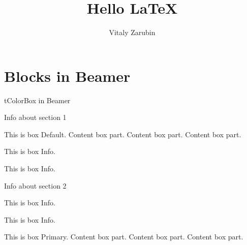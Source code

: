 \documentclass{beamer}
\begin{document}
    \title{Hello LaTeX}
    \author{Vitaly Zarubin}

    \begin{frame}
        \titlepage
    \end{frame}

    \section{Blocks in Beamer}\label{sec:blocks-in-beamer}
    \begin{frame}{tColorBox in Beamer}
        \begin{multicols}{2}

            Info about section 1

            \begin{mybox}
                This is box Default.
                \tcblower
                Content box part.
                Content box part.
                Content box part.
            \end{mybox}

            \begin{myboxinfo}
                This is box Info.
            \end{myboxinfo}

            \begin{myboxsuccess}
                This is box Info.
            \end{myboxsuccess}

            \columnbreak

            Info about section 2

            \begin{myboxwarning}
                This is box Info.
            \end{myboxwarning}

            \begin{myboxerror}
                This is box Info.
            \end{myboxerror}

            \begin{myboxprimary}
                This is box Primary.
                \tcblower
                Content box part.
                Content box part.
                Content box part.
            \end{myboxprimary}

        \end{multicols}
    \end{frame}
\end{document}

